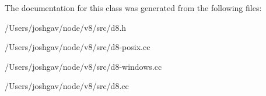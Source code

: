 The documentation for this class was generated from the following files\+:\begin{DoxyCompactItemize}
\item 
/\+Users/joshgav/node/v8/src/d8.\+h\item 
/\+Users/joshgav/node/v8/src/d8-\/posix.\+cc\item 
/\+Users/joshgav/node/v8/src/d8-\/windows.\+cc\item 
/\+Users/joshgav/node/v8/src/d8.\+cc\end{DoxyCompactItemize}
